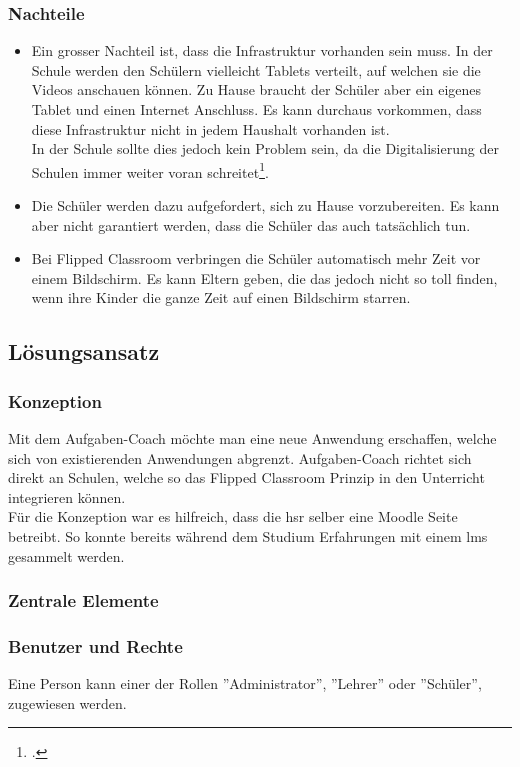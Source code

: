 \subsubsection*{Nachteile}
\begin{itemize}
	\item Ein grosser Nachteil ist, dass die Infrastruktur vorhanden sein muss. In der Schule werden den Schülern vielleicht Tablets verteilt, auf welchen sie die Videos anschauen können. Zu Hause braucht der Schüler aber ein eigenes Tablet und einen Internet Anschluss. Es kann durchaus vorkommen, dass diese Infrastruktur nicht in jedem Haushalt vorhanden ist. \\
	In der Schule sollte dies jedoch kein Problem sein, da die Digitalisierung der Schulen immer weiter voran schreitet\footcite{digitale_schule}.
	\item Die Schüler werden dazu aufgefordert, sich zu Hause vorzubereiten. Es kann aber nicht garantiert werden, dass die Schüler das auch tatsächlich tun.
	\item Bei Flipped Classroom verbringen die Schüler automatisch mehr Zeit vor einem Bildschirm. Es kann Eltern geben, die das jedoch nicht so toll finden, wenn ihre Kinder die ganze Zeit auf einen Bildschirm starren.
\end{itemize}

\subsection{Lösungsansatz}
\subsubsection{Konzeption}
Mit dem Aufgaben-Coach möchte man eine neue Anwendung erschaffen, welche sich von existierenden Anwendungen abgrenzt. Aufgaben-Coach richtet sich direkt an Schulen, welche so das Flipped Classroom Prinzip in den Unterricht integrieren können. \\

Für die Konzeption war es hilfreich, dass die \gls{hsr} selber eine Moodle Seite betreibt. So konnte bereits während dem Studium Erfahrungen mit einem \gls{lms} gesammelt werden.

\subsubsection{Zentrale Elemente}
\subsubsection*{Benutzer und Rechte}
Eine Person kann einer der Rollen ''Administrator'', ''Lehrer'' oder ''Schüler'', zugewiesen werden. \\

